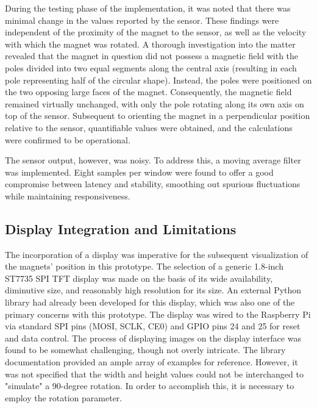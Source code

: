 	During the testing phase of the implementation, it was noted that there was minimal change in the values reported by the sensor. These findings were independent of the proximity of the magnet to the sensor, as well as the velocity with which the magnet was rotated. A thorough investigation into the matter revealed that the magnet in question did not possess a magnetic field with the poles divided into two equal segments along the central axis (resulting in each pole representing half of the circular shape). Instead, the poles were positioned on the two opposing large faces of the magnet. Consequently, the magnetic field remained virtually unchanged, with only the pole rotating along its own axis on top of the sensor. Subsequent to orienting the magnet in a perpendicular position relative to the sensor, quantifiable values were obtained, and the calculations were confirmed to be operational.
	
	The sensor output, however, was noisy. To address this, a moving average filter was implemented. Eight samples per window were found to offer a good compromise between latency and stability, smoothing out spurious fluctuations while maintaining responsiveness.
	
	\subsection{Display Integration and Limitations}
	The incorporation of a display was imperative for the subsequent visualization of the magnets' position in this prototype. The selection of a generic 1.8-inch ST7735 SPI TFT display was made on the basis of its wide availability, diminutive size, and reasonably high resolution for its size. An external Python library had already been developed for this display, which was also one of the primary concerns with this prototype. The display was wired to the Raspberry Pi via standard SPI pins (MOSI, SCLK, CE0) and GPIO pins 24 and 25 for reset and data control.
	The process of displaying images on the display interface was found to be somewhat challenging, though not overly intricate. The library documentation provided an ample array of examples for reference. However, it was not specified that the width and height values could not be interchanged to "simulate" a 90-degree rotation. In order to accomplish this, it is necessary to employ the rotation parameter.
	
